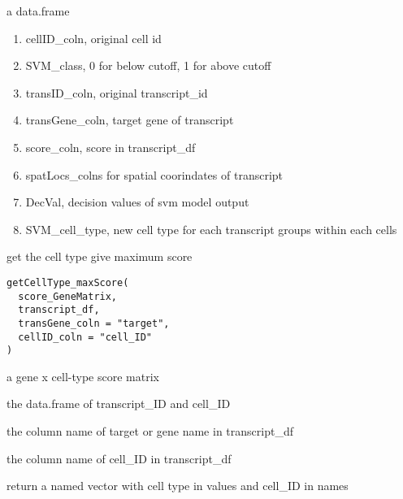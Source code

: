 \documentclass[letterpaper]{book}
\begin{document}
\begin{Value}
a data.frame
\begin{enumerate}

\item{} cellID\_coln, original cell id
\item{} SVM\_class, 0 for below cutoff, 1 for above cutoff
\item{} transID\_coln, original transcript\_id
\item{} transGene\_coln, target gene of transcript
\item{} score\_coln, score in transcript\_df
\item{} spatLocs\_colns for spatial coorindates of transcript
\item{} DecVal, decision values of svm model output
\item{} SVM\_cell\_type, new cell type for each transcript groups within each cells

\end{enumerate}

\end{Value}
%
\begin{Description}
get the cell type give maximum score
\end{Description}
%
\begin{Usage}
\begin{verbatim}
getCellType_maxScore(
  score_GeneMatrix,
  transcript_df,
  transGene_coln = "target",
  cellID_coln = "cell_ID"
)
\end{verbatim}
\end{Usage}
%
\begin{Arguments}
\begin{ldescription}
\item[\code{score\_GeneMatrix}] a gene x cell-type score matrix

\item[\code{transcript\_df}] the data.frame of transcript\_ID and cell\_ID

\item[\code{transGene\_coln}] the column name of target or gene name in transcript\_df

\item[\code{cellID\_coln}] the column name of cell\_ID in transcript\_df
\end{ldescription}
\end{Arguments}
%
\begin{Value}
return a named vector with cell type in values and cell\_ID in names
\end{Value}
\end{document}
